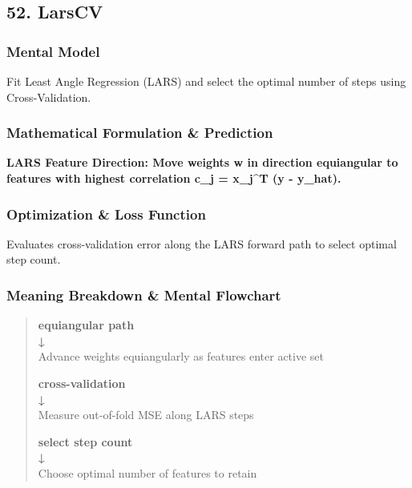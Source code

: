 \documentclass[
  10pt,
  letterpaper,
]{article}
\begin{document}
\hypertarget{larscv}{%
\subsection{52. LarsCV}\label{larscv}}

\hypertarget{mental-model-51}{%
\subsubsection{Mental Model}\label{mental-model-51}}

Fit Least Angle Regression (LARS) and select the optimal number of steps using Cross-Validation.

\hypertarget{mathematical-formulation-prediction-51}{%
\subsubsection{Mathematical Formulation \& Prediction}\label{mathematical-formulation-prediction-51}}

\textbf{LARS Feature Direction: Move weights w in direction equiangular to features with highest correlation c\_j = x\_j\^{}T (y - y\_hat).}

\hypertarget{optimization-loss-function-51}{%
\subsubsection{Optimization \& Loss Function}\label{optimization-loss-function-51}}

Evaluates cross-validation error along the LARS forward path to select optimal step count.

\hypertarget{meaning-breakdown-mental-flowchart-51}{%
\subsubsection{Meaning Breakdown \& Mental Flowchart}\label{meaning-breakdown-mental-flowchart-51}}

\begin{quote}
\textbf{equiangular path\\
↓\\
}Advance weights equiangularly as features enter active set

\textbf{cross-validation\\
↓\\
}Measure out-of-fold MSE along LARS steps

\textbf{select step count\\
↓\\
}Choose optimal number of features to retain
\end{quote}
\end{document}

